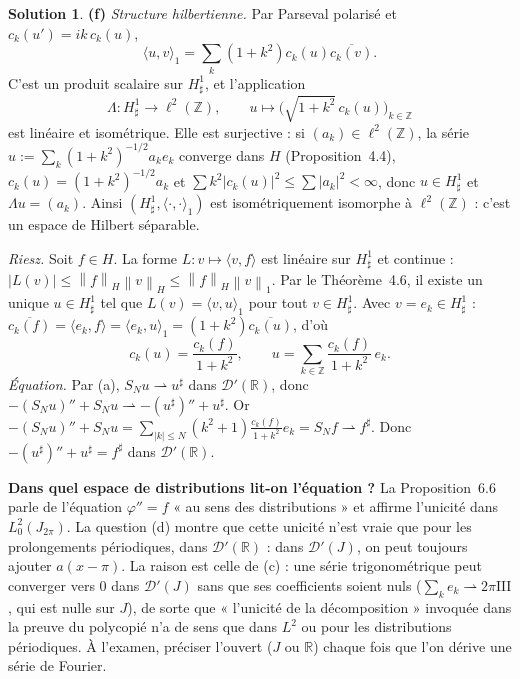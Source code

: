 \documentclass[11pt,a4paper]{article}
\newcommand{\R}{\mathbb{R}}
\newcommand{\Z}{\mathbb{Z}}
\newcommand{\norm}[1]{\left\|#1\right\|}
\newcommand{\wk}{\rightharpoonup}
\newcommand{\D}{\mathcal{D}}
\newcommand{\Sha}{\mathrm{III}}
\theoremstyle{definition}
\newtheorem*{solution}{Solution}
\begin{document}
\begin{solution}
\medskip
\noindent\textbf{(f)} \emph{Structure hilbertienne.} Par Parseval polarisé et $c_k(u')=ik\,c_k(u)$,
\[
\langle u,v\rangle_1=\sum_k(1+k^2)c_k(u)\overline{c_k(v)} .
\]
C'est un produit scalaire sur $H^1_\sharp$, et l'application
\[
\Lambda:H^1_\sharp\to\ell^2(\Z),\qquad u\mapsto\big(\sqrt{1+k^2}\,c_k(u)\big)_{k\in\Z}
\]
est linéaire et isométrique. Elle est surjective : si $(a_k)\in\ell^2(\Z)$, la série $u:=\sum_k(1+k^2)^{-1/2}a_ke_k$ converge dans $H$ (Proposition~4.4), $c_k(u)=(1+k^2)^{-1/2}a_k$ et $\sum k^2|c_k(u)|^2\le\sum|a_k|^2<\infty$, donc $u\in H^1_\sharp$ et $\Lambda u=(a_k)$. Ainsi $(H^1_\sharp,\langle\cdot,\cdot\rangle_1)$ est isométriquement isomorphe à $\ell^2(\Z)$ : c'est un espace de Hilbert séparable.

\emph{Riesz.} Soit $f\in H$. La forme $L:v\mapsto\langle v,f\rangle$ est linéaire sur $H^1_\sharp$ et continue : $|L(v)|\le\norm f_H\norm v_H\le\norm f_H\norm v_1$. Par le Théorème~4.6, il existe un unique $u\in H^1_\sharp$ tel que $L(v)=\langle v,u\rangle_1$ pour tout $v\in H^1_\sharp$. Avec $v=e_k\in H^1_\sharp$ : $\overline{c_k(f)}=\langle e_k,f\rangle=\langle e_k,u\rangle_1=(1+k^2)\overline{c_k(u)}$, d'où
\[
c_k(u)=\frac{c_k(f)}{1+k^2},\qquad u=\sum_{k\in\Z}\frac{c_k(f)}{1+k^2}\,e_k .
\]
\emph{Équation.} Par (a), $S_Nu\wk u^\sharp$ dans $\D'(\R)$, donc $-(S_Nu)''+S_Nu\wk-(u^\sharp)''+u^\sharp$. Or $-(S_Nu)''+S_Nu=\sum_{|k|\le N}(k^2+1)\frac{c_k(f)}{1+k^2}e_k=S_Nf\wk f^\sharp$. Donc $-(u^\sharp)''+u^\sharp=f^\sharp$ dans $\D'(\R)$.
\end{solution}

\begin{piege}
\textbf{Dans quel espace de distributions lit-on l'équation ?} La Proposition~6.6 parle de l'équation $\varphi''=f$ « au sens des distributions » et affirme l'unicité dans $L^2_0(J_{2\pi})$. La question (d) montre que cette unicité n'est vraie que pour les prolongements périodiques, dans $\D'(\R)$ : dans $\D'(J)$, on peut toujours ajouter $a(x-\pi)$. La raison est celle de (c) : une série trigonométrique peut converger vers $0$ dans $\D'(J)$ sans que ses coefficients soient nuls ($\sum_{k}e_k\wk2\pi\Sha$, qui est nulle sur $J$), de sorte que « l'unicité de la décomposition » invoquée dans la preuve du polycopié n'a de sens que dans $L^2$ ou pour les distributions périodiques. À l'examen, préciser l'ouvert ($J$ ou $\R$) chaque fois que l'on dérive une série de Fourier.
\end{piege}
\end{document}
